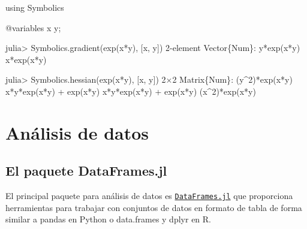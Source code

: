 \documentclass[
  letterpaper,
  DIV=11,
  numbers=noendperiod]{scrreprt}
\newenvironment{Shaded}{\begin{snugshade}}{\end{snugshade}}
\newcommand{\BuiltInTok}[1]{\textcolor[rgb]{0.00,0.23,0.31}{#1}}
\newcommand{\DataTypeTok}[1]{\textcolor[rgb]{0.68,0.00,0.00}{#1}}
\newcommand{\FloatTok}[1]{\textcolor[rgb]{0.68,0.00,0.00}{#1}}
\newcommand{\FunctionTok}[1]{\textcolor[rgb]{0.28,0.35,0.67}{#1}}
\newcommand{\ImportTok}[1]{\textcolor[rgb]{0.00,0.46,0.62}{#1}}
\newcommand{\NormalTok}[1]{\textcolor[rgb]{0.00,0.23,0.31}{#1}}
\newcommand{\OperatorTok}[1]{\textcolor[rgb]{0.37,0.37,0.37}{#1}}
\newcommand{\PreprocessorTok}[1]{\textcolor[rgb]{0.68,0.00,0.00}{#1}}
\begin{document}
\begin{Shaded}
\begin{Highlighting}[]
\ImportTok{using} \BuiltInTok{Symbolics}

\PreprocessorTok{@variables}\NormalTok{ x y;}

\NormalTok{julia}\OperatorTok{\textgreater{}}\NormalTok{ Symbolics.}\FunctionTok{gradient}\NormalTok{(}\FunctionTok{exp}\NormalTok{(x}\OperatorTok{*}\NormalTok{y), [x, y])}
\FloatTok{2}\OperatorTok{{-}}\NormalTok{element }\DataTypeTok{Vector}\NormalTok{\{Num\}}\OperatorTok{:}
 \FunctionTok{y*exp}\NormalTok{(x}\OperatorTok{*}\NormalTok{y)}
 \FunctionTok{x*exp}\NormalTok{(x}\OperatorTok{*}\NormalTok{y)}

\NormalTok{julia}\OperatorTok{\textgreater{}}\NormalTok{ Symbolics.}\FunctionTok{hessian}\NormalTok{(}\FunctionTok{exp}\NormalTok{(x}\OperatorTok{*}\NormalTok{y), [x, y])}
\FloatTok{2}\OperatorTok{×}\FloatTok{2} \DataTypeTok{Matrix}\NormalTok{\{Num\}}\OperatorTok{:}
\NormalTok{ (y}\OperatorTok{\^{}}\FloatTok{2}\NormalTok{)}\FunctionTok{*exp}\NormalTok{(x}\OperatorTok{*}\NormalTok{y)               }\FunctionTok{x*y*exp}\NormalTok{(x}\OperatorTok{*}\NormalTok{y) }\OperatorTok{+} \FunctionTok{exp}\NormalTok{(x}\OperatorTok{*}\NormalTok{y)}
   \FunctionTok{x*y*exp}\NormalTok{(x}\OperatorTok{*}\NormalTok{y) }\OperatorTok{+} \FunctionTok{exp}\NormalTok{(x}\OperatorTok{*}\NormalTok{y)  (x}\OperatorTok{\^{}}\FloatTok{2}\NormalTok{)}\FunctionTok{*exp}\NormalTok{(x}\OperatorTok{*}\NormalTok{y)}
\end{Highlighting}
\end{Shaded}


\hypertarget{anuxe1lisis-de-datos}{%
\chapter{Análisis de datos}\label{anuxe1lisis-de-datos}}

\hypertarget{el-paquete-dataframes.jl}{%
\section{El paquete DataFrames.jl}\label{el-paquete-dataframes.jl}}

El principal paquete para análisis de datos es
\href{https://dataframes.juliadata.org/stable/}{\texttt{DataFrames.jl}}
que proporciona herramientas para trabajar con conjuntos de datos en
formato de tabla de forma similar a pandas en Python o data.frames y
dplyr en R.
\end{document}
